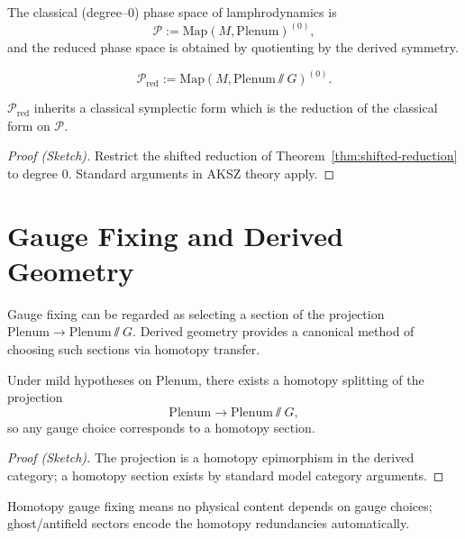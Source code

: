 The classical (degree--$0$) phase space of lamphrodynamics is
\[
\mathcal{P}
:= \mathrm{Map}(M,\mathrm{Plenum})^{(0)},
\]
and the reduced phase space is obtained by quotienting by the derived
symmetry.

\begin{definition}
\[
\mathcal{P}_{\mathrm{red}}
:= \mathrm{Map}(M,\mathrm{Plenum}\sslash G)^{(0)}.
\]
\end{definition}

\begin{proposition}
\label{prop:reduced-symplectic}
$\mathcal{P}_{\mathrm{red}}$ inherits a classical symplectic form which
is the reduction of the classical form on $\mathcal{P}$.
\end{proposition}

\begin{proof}[Proof (Sketch)]
Restrict the shifted reduction of Theorem~\ref{thm:shifted-reduction}
to degree $0$.  Standard arguments in AKSZ theory apply.
\end{proof}



\section{Gauge Fixing and Derived Geometry}
\label{sec:gauge-fix}

Gauge fixing can be regarded as selecting a section of the projection
$\mathrm{Plenum}\to\mathrm{Plenum}\sslash G$.  Derived geometry provides
a canonical method of choosing such sections via homotopy transfer.

\begin{theorem}
\label{thm:gauge-fix}
Under mild hypotheses on $\mathrm{Plenum}$, there exists a homotopy
splitting of the projection
\[
\mathrm{Plenum}\longrightarrow\mathrm{Plenum}\sslash G,
\]
so any gauge choice corresponds to a homotopy section.
\end{theorem}

\begin{proof}[Proof (Sketch)]
The projection is a homotopy epimorphism in the derived category; a
homotopy section exists by standard model category arguments.
\end{proof}

\begin{remark}
Homotopy gauge fixing means no physical content depends on gauge
choices; ghost/antifield sectors encode the homotopy redundancies
automatically.
\end{remark}



